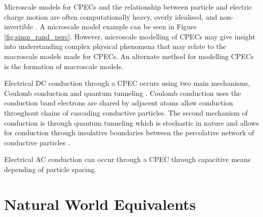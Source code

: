 Microscale models for CPECs and the relationship between particle and electric charge motion are often computationally heavy, overly idealised, and non-invertible \cite{Wang2022}. A microscale model example can be seen in Figure \ref{fig:simp_rand_perc}. However, microscale modelling of CPECs may give insight into understanding complex physical phenomena that may relate to the macroscale models made for CPECs. An alternate method for modelling CPECs is the formation of macroscale models\cite{Neffati2019}.

Electrical DC conduction through a CPEC occurs using two main mechanisms, Coulomb conduction and quantum tunneling \cite{Bloor2006,Duan2014,Zhang2007,Madrid2017}. Coulomb conduction uses the conduction band electrons are shared by adjacent atoms allow conduction throughout chains of cascading conductive particles. The second mechanism of conduction is through quantum tunneling which is stochastic in nature and allows for conduction through insulative boundaries between the percolative network of conductive particles \cite{Hu2008,Grimaldi2006}. 

Electrical AC conduction can occur through a CPEC through capacitive means depending of particle spacing\cite{??}.



\section{Natural World Equivalents}
\label{sec:It Has Been Done Before}

